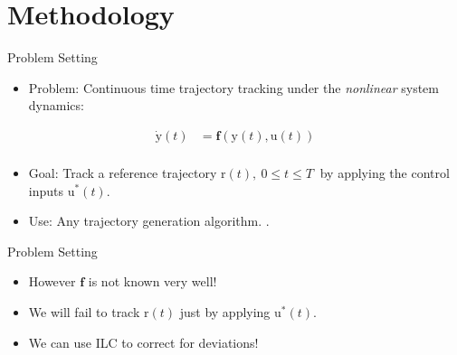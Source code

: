 \documentclass[handout]{beamer}
\newcommand{\boldvec}[1]{\boldsymbol{\mathrm{#1}}}
\let\vec\boldvec
\newcommand{\state}{\vec{y}} %
\newcommand{\traj}{\vec{r}} %
\newcommand{\sysInput}{\vec{u}} %
\begin{document}
\section{Methodology}
%
\begin{frame}{Problem Setting}
\begin{itemize}
\item Problem: Continuous time trajectory tracking under the \emph{nonlinear} system dynamics: 
\end{itemize}
\begin{equation*}
\begin{aligned}
\dot{\state}(t) &= \mathbf{f}(\state(t),\sysInput(t)) \\
\end{aligned}
\end{equation*}
\begin{itemize}
\item Goal: Track a reference trajectory $\traj(t), \ 0 \leq t \leq T \ $ by applying the control inputs $\sysInput^{*}(t)$. 
\item Use: Any trajectory generation algorithm.
.
\end{itemize}
\end{frame}
%
\begin{frame}{Problem Setting}
\begin{itemize}	
\item However $\mathbf{f}$ is not known very well! 
\item We will fail to track $\traj(t)$ just by applying $\sysInput^{*}(t)$.
\item We can use ILC to correct for deviations! 
\end{itemize}
\end{frame}
%
\end{document}
